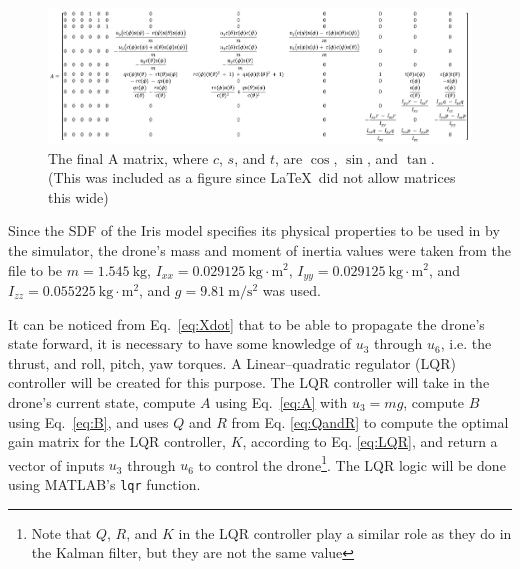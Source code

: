 \documentclass[letterpaper, paper,11pt]{AAS}	%
\begin{document}
\begin{figure}[H]
	\centering\includegraphics[width=\textwidth]{Figures/AMatrix}
	\caption{The final A matrix, where $c$, $s$, and $t$, are $\cos$, $\sin$, and $\tan$. (This was included as a figure since \LaTeX\ did not allow matrices this wide)}
	\label{fig:AMatrix}
\end{figure}

Since the SDF of the Iris model specifies its physical properties to be used in by the simulator, the drone's mass and moment of inertia values were taken from the file to be $m = 1.545\ \text{kg}$, $I_{xx} = 0.029125\ \text{kg}\cdot \text{m}^2$, $I_{yy} = 0.029125\ \text{kg}\cdot \text{m}^2$, and $I_{zz} = 0.055225\ \text{kg}\cdot \text{m}^2$, and $g = 9.81\ \text{m}/\text{s}^2$ was used.

It can be noticed from Eq.~\ref{eq:Xdot} that to be able to propagate the drone's state forward, it is necessary to have some knowledge of $u_3$ through $u_6$, i.e. the thrust, and roll, pitch, yaw torques. A Linear–quadratic regulator (LQR) controller will be created for this purpose. The LQR controller will take in the drone's current state, compute $A$ using Eq.~\ref{eq:A} with $u_3 = mg$, compute $B$ using Eq.~\ref{eq:B}, and uses $Q$ and $R$ from Eq. \ref{eq:QandR} to compute the optimal gain matrix for the LQR controller, $K$, according to Eq. \ref{eq:LQR}, and return a vector of inputs $u_3$ through $u_6$ to control the drone\footnote{Note that $Q$, $R$, and $K$ in the LQR controller play a similar role as they do in the Kalman filter, but they are not the same value}. The LQR logic will be done using MATLAB's \texttt{lqr} function\cite{LQR}.
\end{document}
